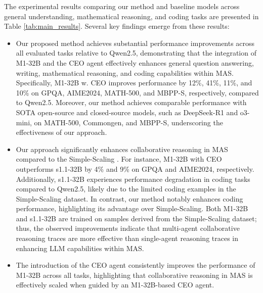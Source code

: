 The experimental results comparing our method and baseline models across general understanding, mathematical reasoning, and coding tasks are presented in Table \ref{tab:main_results}. Several key findings emerge from these results:
\begin{itemize}
    \item Our proposed method achieves substantial performance improvements across all evaluated tasks relative to Qwen2.5, demonstrating that the integration of M1-32B and the CEO agent effectively enhances general question answering, writing, mathematical reasoning, and coding capabilities within MAS. Specifically, M1-32B w. CEO improves performance by 12\%, 41\%, 11\%, and 10\% on GPQA, AIME2024, MATH-500, and MBPP-S, respectively, compared to Qwen2.5. Moreover, our method achieves comparable performance with SOTA open-source and closed-source models, such as DeepSeek-R1 and o3-mini, on MATH-500, Commongen, and MBPP-S, underscoring the effectiveness of our approach.

    \item Our approach significantly enhances collaborative reasoning in MAS compared to the Simple-Scaling \citep{s1}. For instance, M1-32B with CEO outperforms s1.1-32B by 4\% and 9\% on GPQA and AIME2024, respectively. Additionally, s1.1-32B experiences performance degradation in coding tasks compared to Qwen2.5, likely due to the limited coding examples in the Simple-Scaling dataset. In contrast, our method notably enhances coding performance, highlighting its advantage over Simple-Scaling. Both M1-32B and s1.1-32B are trained on samples derived from the Simple-Scaling dataset; thus, the observed improvements indicate that multi-agent collaborative reasoning traces are more effective than single-agent reasoning traces in enhancing LLM capabilities within MAS.

    \item The introduction of the CEO agent consistently improves the performance of M1-32B across all tasks, highlighting that collaborative reasoning in MAS is effectively scaled when guided by an M1-32B-based CEO agent.
\end{itemize}


